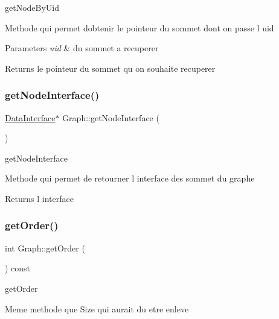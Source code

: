 get\+Node\+By\+Uid 

Methode qui permet d\textquotesingle{}obtenir le pointeur du sommet dont on passe l uid


\begin{DoxyParams}{Parameters}
{\em uid} & du sommet a recuperer \\
\hline
\end{DoxyParams}
\begin{DoxyReturn}{Returns}
le pointeur du sommet qu on souhaite recuperer 
\end{DoxyReturn}
\mbox{\label{class_graph_a9bda05ab33875f275e6a0e44862febf4}} 
\subsubsection{\texorpdfstring{get\+Node\+Interface()}{getNodeInterface()}}
{\footnotesize\ttfamily \mbox{\hyperlink{struct_data_interface}{Data\+Interface}}$\ast$ Graph\+::get\+Node\+Interface (\begin{DoxyParamCaption}{ }\end{DoxyParamCaption})}



get\+Node\+Interface 

Methode qui permet de retourner l interface des sommet du graphe

\begin{DoxyReturn}{Returns}
l interface 
\end{DoxyReturn}
\mbox{\label{class_graph_a4edd61cf5268a3d467dafa9867376546}} 
\subsubsection{\texorpdfstring{get\+Order()}{getOrder()}}
{\footnotesize\ttfamily int Graph\+::get\+Order (\begin{DoxyParamCaption}{ }\end{DoxyParamCaption}) const}



get\+Order 

Meme methode que Size qui aurait du etre enleve \mbox{\label{class_graph_a45c6a79b3251a56674cbabf980f8cea7}} 
